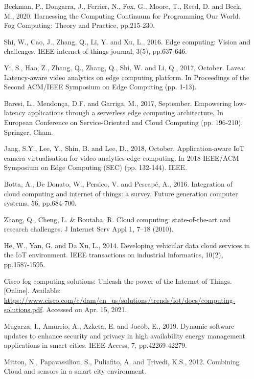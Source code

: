 \documentclass{ieeeaccess}
\begin{document}
\begin{thebibliography}{00}
 Beckman, P., Dongarra, J., Ferrier, N., Fox, G., Moore, T., Reed, D. and Beck, M., 2020. Harnessing the Computing Continuum for Programming Our World. Fog Computing: Theory and Practice, pp.215-230.

 Shi, W., Cao, J., Zhang, Q., Li, Y. and Xu, L., 2016. Edge computing: Vision and challenges. IEEE internet of things journal, 3(5), pp.637-646.

 Yi, S., Hao, Z., Zhang, Q., Zhang, Q., Shi, W. and Li, Q., 2017, October. Lavea: Latency-aware video analytics on edge computing platform. In Proceedings of the Second ACM/IEEE Symposium on Edge Computing (pp. 1-13).

 Baresi, L., Mendonça, D.F. and Garriga, M., 2017, September. Empowering low-latency applications through a serverless edge computing architecture. In European Conference on Service-Oriented and Cloud Computing (pp. 196-210). Springer, Cham.

 Jang, S.Y., Lee, Y., Shin, B. and Lee, D., 2018, October. Application-aware IoT camera virtualisation for video analytics edge computing. In 2018 IEEE/ACM Symposium on Edge Computing (SEC) (pp. 132-144). IEEE.

 Botta, A., De Donato, W., Persico, V. and Pescapé, A., 2016. Integration of cloud computing and internet of things: a survey. Future generation computer systems, 56, pp.684-700.

 Zhang, Q., Cheng, L. \& Boutaba, R. Cloud computing: state-of-the-art and research challenges. J Internet Serv Appl 1, 7–18 (2010).

 He, W., Yan, G. and Da Xu, L., 2014. Developing vehicular data cloud services in the IoT environment. IEEE transactions on industrial informatics, 10(2), pp.1587-1595.

 Cisco fog computing solutions: Unleash the power of the Internet of Things. [Online]. Available: \url{https://www.cisco.com/c/dam/en\_us/solutions/trends/iot/docs/computing-solutions.pdf}. Accessed on Apr. 15, 2021.

 Mugarza, I., Amurrio, A., Azketa, E. and Jacob, E., 2019. Dynamic software updates to enhance security and privacy in high availability energy management applications in smart cities. IEEE Access, 7, pp.42269-42279.

 Mitton, N., Papavassiliou, S., Puliafito, A. and Trivedi, K.S., 2012. Combining Cloud and sensors in a smart city environment.


\end{thebibliography}
\end{document}
